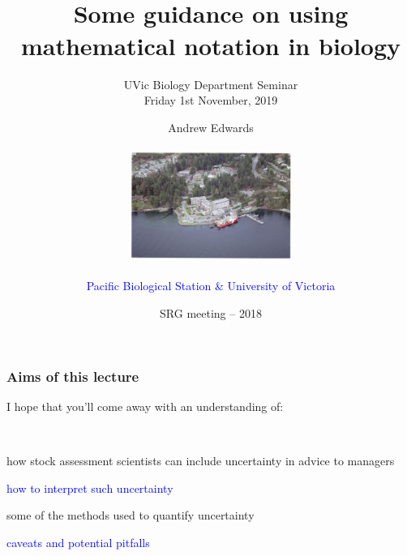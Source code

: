

\title[Notation]{~\\ Some guidance on using mathematical notation in biology}
\author{Andrew Edwards\\ ~\\ \includegraphics[height=3.5cm]{images/pbs.png}\\
  ~\\ \textcolor{blue}{Pacific Biological Station \& University of Victoria}}
\date{{\footnotesize SRG meeting -- 2018}}
\subtitle{\small UVic Biology Department Seminar\\
Friday 1st November, 2019}


\beamertemplatenavigationsymbolsempty   %

\frame[plain]{
\titlepage
}



\begin{frame}
\frametitle{Aims of this lecture}

I hope that you'll come away with an understanding of:

~\\

\begin{minipage}{12cm}
\bi
  \item how stock assessment scientists can include
    uncertainty in advice to managers
  \item \textcolor{blue}{how to interpret such uncertainty}
  \item some of the methods used to quantify uncertainty
  \item \textcolor{blue}{caveats and potential pitfalls}
\ei
\end{minipage}
\end{frame}



